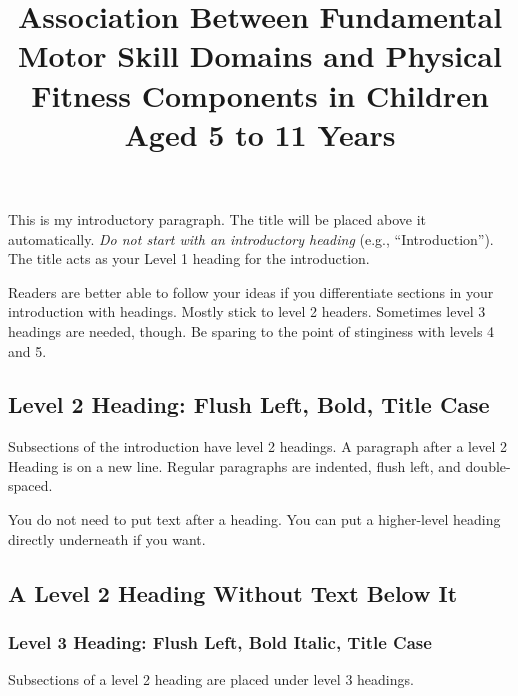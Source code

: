 \documentclass[
  man,
  colorlinks=true,linkcolor=blue,citecolor=blue,urlcolor=blue]{apa7}
\title{Association Between Fundamental Motor Skill Domains and Physical
Fitness Components in Children Aged 5 to 11 Years}
\date{}
\begin{document}
\maketitle
\ifdefined\Shaded\renewenvironment{Shaded}{\begin{tcolorbox}[boxrule=0pt, breakable, sharp corners, borderline west={3pt}{0pt}{shadecolor}, interior hidden, frame hidden, enhanced]}{\end{tcolorbox}}\fi
This is my introductory paragraph. The title will be placed above it
automatically. \emph{Do not start with an introductory heading} (e.g.,
``Introduction''). The title acts as your Level 1 heading for the
introduction.

Readers are better able to follow your ideas if you differentiate
sections in your introduction with headings. Mostly stick to level 2
headers. Sometimes level 3 headings are needed, though. Be sparing to
the point of stinginess with levels 4 and 5.

\hypertarget{level-2-heading-flush-left-bold-title-case}{%
\subsection{Level 2 Heading: Flush Left, Bold, Title
Case}\label{level-2-heading-flush-left-bold-title-case}}

Subsections of the introduction have level 2 headings. A paragraph after
a level 2 Heading is on a new line. Regular paragraphs are indented,
flush left, and double-spaced.

You do not need to put text after a heading. You can put a higher-level
heading directly underneath if you want.

\hypertarget{a-level-2-heading-without-text-below-it}{%
\subsection{A Level 2 Heading Without Text Below
It}\label{a-level-2-heading-without-text-below-it}}

\hypertarget{level-3-heading-flush-left-bold-italic-title-case}{%
\subsubsection{Level 3 Heading: Flush Left, Bold Italic, Title
Case}\label{level-3-heading-flush-left-bold-italic-title-case}}

Subsections of a level 2 heading are placed under level 3 headings.
\end{document}
